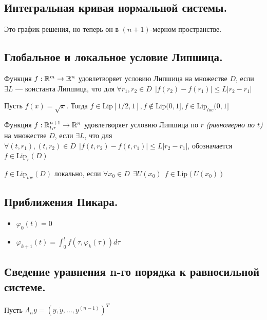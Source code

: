 \subsection*{Интегральная кривая нормальной системы.}

Это график решения, но теперь он в \((n + 1)\)-мерном пространстве.

\subsection*{Глобальное и локальное условие Липшица.}

Функция \(f : \mathbb{R}^m \to \mathbb{R}^n\) удовлетворяет условию Липшица на множестве \(D\), если \(\exists L\) --- константа Липшица, что для \(\forall r_1, r_2\in D \ \ |f(r_2) - f(r_1)| \leq L|r_2 - r_1|\)

\begin{example}
    Пусть \(f(x) = \sqrt{x}\). Тогда \(f\in \text{Lip}[1 / 2, 1], f\not\in \text{Lip}(0, 1], f\in \text{Lip}_{loc}(0, 1]\)
\end{example}

Функция \(f : \mathbb{R}^{n + 1}_{t, r} \to \mathbb{R}^n\) удовлетворяет условию Липшица по \(r\) \textit{(равномерно по \(t\))} на множестве \(D\), если \(\exists L\), что для \(\forall (t, r_1), (t, r_2)\in D \ \ |f(t, r_2) - f(t, r_1)| \leq L|r_2 - r_1|\), обозначается \(f\in \text{Lip}_r(D)\)

\(f \in \text{Lip}_{loc}(D)\) локально, если \(\forall x_0\in D \ \ \exists U(x_0) \ \ f\in \text{Lip}(U(x_0))\)

\subsection*{Приближения Пикара.}

\begin{itemize}
    \item \(\varphi_0(t) = 0\)
    \item \(\varphi_{k + 1}(t) = \int_0^t f(\tau, \varphi_k(\tau))d\tau\)
\end{itemize}

\subsection*{Сведение уравнения n-го порядка к равносильной системе.}

Пусть \(\Lambda_n y = (y, \dot{y}, \dots , y^{(n - 1)})^T\)


